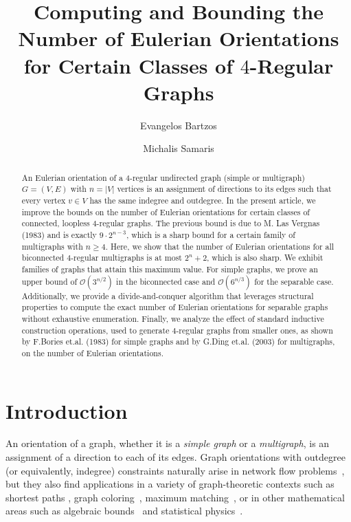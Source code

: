 \documentclass{article}
\title{Computing and Bounding the Number of Eulerian Orientations for Certain Classes of $4$-Regular Graphs}
\date{}
\author[1,2]{Evangelos Bartzos}
\author[3] {Michalis Samaris}
\affil[1]{“Athena” Research Center, Maroussi, Greece}
\affil[2]{Department of Informatics \& Telecommunications, National \& Kapodistrian University of Athens, Athens, Greece 
}
\affil[3]{Athens University of Economics and Business, Athens, Greece}
\begin{document}
\maketitle

\maketitle

	\begin{abstract}
		An Eulerian orientation of a $4$-regular undirected graph (simple or multigraph) $G=(V,E)$ with $n=|V|$ vertices is an assignment of directions to its edges such that every vertex $v \in V$ has the same indegree and outdegree. 
        In the present article, we improve the bounds on the number of Eulerian orientations for certain classes of connected, loopless $4$-regular graphs. 
        The previous bound is due to M. Las Vergnas (1983) and is exactly $9\cdot 2^{n-3}$, which is a sharp bound for a certain family of multigraphs with $n\geq 4$.
        Here, we show that the number of Eulerian orientations for all biconnected $4$-regular multigraphs is at most $2^n+2$, which is also sharp.
        We exhibit families of graphs that attain this maximum value. 
        For simple graphs, we prove an upper bound of $\mathcal{O}(3^{n/2})$ in the biconnected case and $\mathcal{O}(6^{n/3})$ for the separable case.
        Additionally, we provide a divide-and-conquer algorithm that leverages structural properties to compute the exact number of Eulerian orientations for separable graphs without exhaustive enumeration.
        Finally, we analyze the effect of standard inductive construction operations, used to generate $4$-regular graphs from smaller ones, as shown by F.Bories et.al. (1983) for simple graphs and by G.Ding et.al. (2003) for multigraphs, on the number of Eulerian orientations.
	\end{abstract}

\section{Introduction}
        An orientation of a graph, whether it is a \emph{simple graph} or a \emph{multigraph}, is an assignment of a direction to each of its edges.
        Graph orientations with outdegree (or equivalently, indegree) constraints naturally arise in network flow problems~\cite{Asahiro2022}, but they also find applications in a variety of graph-theoretic contexts such as shortest paths \cite{Shortest_Paths}, graph coloring~\cite{graph_coloring}, maximum matching~\cite{matching}, or in other mathematical areas such as algebraic bounds~\cite{betISSAC} and statistical physics~\cite{welsh1990}.
\end{document}
